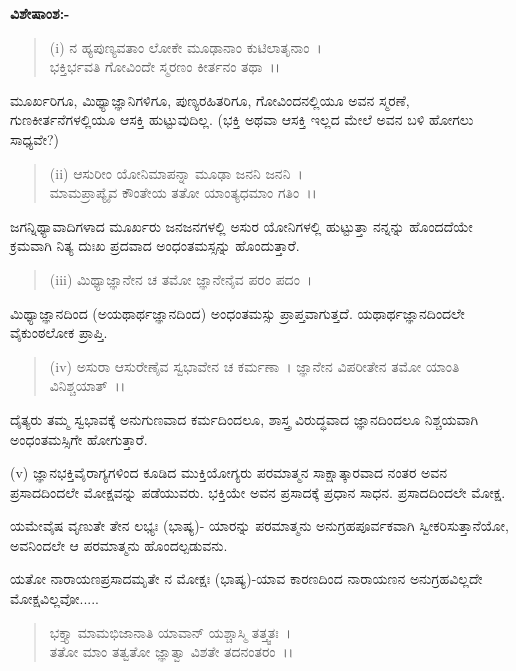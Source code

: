 \noindent
\textbf{ವಿಶೇಷಾಂಶ:-}

\begin{verse}
(i) ನ ಹ್ಯಪುಣ್ಯವತಾಂ ಲೋಕೇ ಮೂಢಾನಾಂ ಕುಟಿಲಾತೃನಾಂ~।\\ ಭಕ್ತಿರ್ಭವತಿ ಗೋವಿಂದೇ ಸ್ಮರಣಂ ಕೀರ್ತನಂ ತಥಾ~।।
\end{verse}


ಮೂರ್ಖರಿಗೂ, ಮಿಥ್ಯಾಜ್ಞಾನಿಗಳಿಗೂ, ಪುಣ್ಯರಹಿತರಿಗೂ, ಗೋವಿಂದನಲ್ಲಿಯೂ ಅವನ ಸ್ಮರಣೆ, ಗುಣಕೀರ್ತನೆಗಳಲ್ಲಿಯೂ ಆಸಕ್ತಿ ಹುಟ್ಟುವುದಿಲ್ಲ. (ಭಕ್ತಿ ಅಥವಾ ಆಸಕ್ತಿ ಇಲ್ಲದ ಮೇಲೆ ಅವನ ಬಳಿ ಹೋಗಲು ಸಾಧ್ಯವೇ?)

\begin{verse}
(ii) ಆಸುರೀಂ ಯೋನಿಮಾಪನ್ನಾ ಮೂಢಾ ಜನನಿ ಜನನಿ~।\\ ಮಾಮಪ್ರಾಪ್ಯೈವ ಕೌಂತೇಯ ತತೋ ಯಾಂತ್ಯಧಮಾಂ ಗತಿಂ~।।
\end{verse}


ಜಗನ್ನಿಥ್ಯಾವಾದಿಗಳಾದ ಮೂರ್ಖರು ಜನಜನಗಳಲ್ಲಿ ಅಸುರ ಯೋನಿಗಳಲ್ಲಿ ಹುಟ್ಟುತ್ತಾ ನನ್ನನ್ನು ಹೊಂದದೆಯೇ ಕ್ರಮವಾಗಿ ನಿತ್ಯ ದುಃಖ ಪ್ರದವಾದ ಅಂಧಂತಮಸ್ಸನ್ನು ಹೊಂದುತ್ತಾರೆ.

\begin{verse}
(iii) ಮಿಥ್ಯಾಜ್ಞಾನೇನ ಚ ತಮೋ ಜ್ಞಾನೇನೈವ ಪರಂ ಪದಂ~।
\end{verse}


ಮಿಥ್ಯಾಜ್ಞಾನದಿಂದ (ಅಯಥಾರ್ಥಜ್ಞಾನದಿಂದ) ಅಂಧಂತಮಸ್ಸು ಪ್ರಾಪ್ತವಾಗುತ್ತದೆ. ಯಥಾರ್ಥಜ್ಞಾನದಿಂದಲೇ ವೈಕುಂಠಲೋಕ ಪ್ರಾಪ್ತಿ.

\begin{verse}
(iv) ಅಸುರಾ ಆಸುರೇಣೈವ ಸ್ವಭಾವೇನ ಚ ಕರ್ಮಣಾ~। ಜ್ಞಾನೇನ ವಿಪರೀತೇನ ತಮೋ ಯಾಂತಿ ವಿನಿಶ್ಚಯಾತ್~।।
\end{verse}


ದೈತ್ಯರು ತಮ್ಮ ಸ್ವಭಾವಕ್ಕೆ ಅನುಗುಣವಾದ ಕರ್ಮದಿಂದಲೂ, ಶಾಸ್ತ್ರ ವಿರುದ್ಧವಾದ ಜ್ಞಾನದಿಂದಲೂ ನಿಶ್ಚಯವಾಗಿ ಅಂಧಂತಮಸ್ಸಿಗೇ ಹೋಗುತ್ತಾರೆ.

(v) ಜ್ಞಾನಭಕ್ತಿವೈರಾಗ್ಯಗಳಿಂದ ಕೂಡಿದ ಮುಕ್ತಿಯೋಗ್ಯರು ಪರಮಾತ್ಮನ ಸಾಕ್ಷಾತ್ಕಾರವಾದ ನಂತರ ಅವನ ಪ್ರಸಾದದಿಂದಲೇ ಮೋಕ್ಷವನ್ನು ಪಡೆಯುವರು. ಭಕ್ತಿಯೇ ಅವನ ಪ್ರಸಾದಕ್ಕೆ ಪ್ರಧಾನ ಸಾಧನ. ಪ್ರಸಾದದಿಂದಲೇ ಮೋಕ್ಷ.

ಯಮೇವೈಷ ವೃಣುತೇ ತೇನ ಲಭ್ಯಃ (ಭಾಷ್ಯ)- ಯಾರನ್ನು ಪರಮಾತ್ಮನು ಅನುಗ್ರಹಪೂರ್ವಕವಾಗಿ ಸ್ವೀಕರಿಸುತ್ತಾನೆಯೋ, ಅವನಿಂದಲೇ ಆ ಪರಮಾತ್ಮನು ಹೊಂದಲ್ಪಡುವನು.

ಯತೋ ನಾರಾಯಣಪ್ರಸಾದಮೃತೇ ನ ಮೋಕ್ಷಃ (ಭಾಷ್ಯ)-ಯಾವ ಕಾರಣದಿಂದ ನಾರಾಯಣನ ಅನುಗ್ರಹವಿಲ್ಲದೇ ಮೋಕ್ಷವಿಲ್ಲವೋ.....

\begin{verse}
ಭಕ್ತ್ಯಾ ಮಾಮಭಿಜಾನಾತಿ ಯಾವಾನ್ ಯಶ್ಚಾಸ್ಮಿ ತತ್ತ್ವತಃ~।\\ ತತೋ ಮಾಂ ತತ್ವತೋ ಜ್ಞಾತ್ವಾ ವಿಶತೇ ತದನಂತರಂ~।।
\end{verse}

